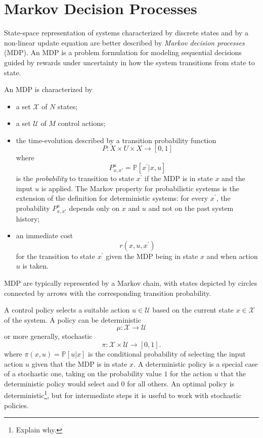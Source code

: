 \chapter{Markov Decision Processes}
\label{chap:markov-decision-processes}

State-space representation of systems characterized by discrete states and by a non-linear update equation are better described by \emph{Markov decision processes} (MDP). An MDP is a problem formulation for modeling sequential decisions guided by rewards under uncertainty in how the system transitions from state to state.

An MDP is characterized by
\begin{itemize}
\item a set $\mathcal{X}$ of $N$ states;
\item a set $\mathcal{U}$ of $M$ control actions;
\item the time-evolution described by a transition probability function
  \begin{equation*}
    P : X\times U\times X \rightarrow [0,1]
  \end{equation*}
  where
  \begin{equation*}
    P^u_{x,x\prime} = \mathbb{P}[x^\prime |x,u]
  \end{equation*}
  is the \emph{probability} to transition to state $x^\prime$ if the MDP is in state $x$ and the input $u$ is applied. The Markov property for probabilistic systems is the extension of the definition for deterministic systems: for every $x^\prime$, the probability $P^u_{x,x\prime}$ depends only on $x$ and $u$ and not on the past system history;
\item an immediate cost
  \begin{equation*}
    r(x,u,x^\prime)
  \end{equation*}
  for the transition to state $x^\prime$ given the MDP being in state $x$ and when action $u$ is taken.
\end{itemize}
MDP are typically represented by a Markov chain, with states depicted by circles connected by arrows with the corresponding transition probability.

A control policy selects a suitable action $u\in \mathcal{U}$ based on the current state $x\in \mathcal{X}$ of the system. A policy can be deterministic
\begin{equation*}
  \mu : \mathcal{X} \rightarrow \mathcal{U}
\end{equation*}
or more generally, stochastic
\begin{equation*}
  \pi : \mathcal{X} \times \mathcal{U} \rightarrow [0,1].
\end{equation*}
where $\pi(x,u) = \mathbb{P}[u|x]$ is the conditional probability of selecting the input action $u$ given that the MDP is in state $x$. A deterministic policy is a special case of a stochastic one, taking on the probability value $1$ for the action $u$ that the deterministic policy would select and $0$ for all others. An optimal policy is deterministic\footnote{Explain why.}, but for intermediate steps it is useful to work with stochastic policies.

